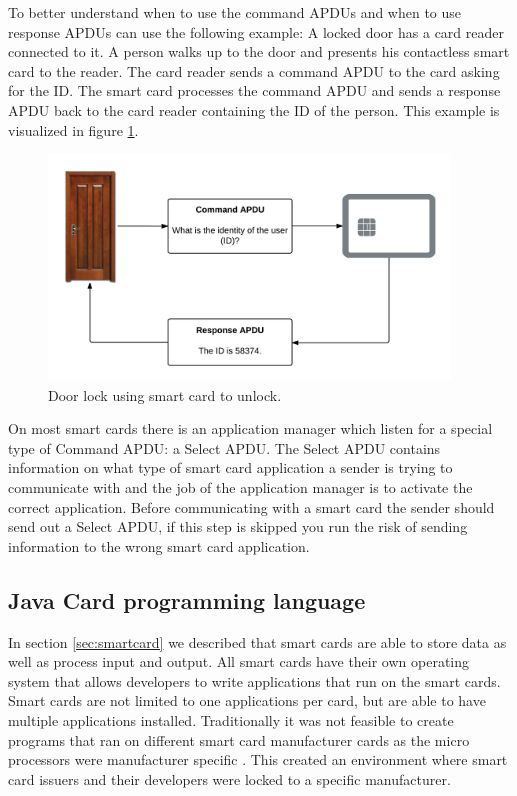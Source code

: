To better understand when to use the command APDUs and when to use response APDUs can use the following example: A locked door has a card reader connected to it. A person walks up to the door and presents his contactless smart card to the reader. The card reader sends a command APDU to the card asking for the ID. The smart card processes the command APDU and sends a response APDU back to the card reader containing the ID of the person. This example is visualized in figure \ref{fig:doornfc}.

\begin{figure}[h!]
  \caption{Door lock using smart card to unlock.}
  \label{fig:doornfc}
  \centering
    \includegraphics[width=0.95\textwidth]{images/doornfc.png}
\end{figure}

On most smart cards there is an application manager which listen for a special type of Command APDU: a Select APDU. The Select APDU contains information on what type of smart card application a sender is trying to communicate with and the job of the application manager is to activate the correct application. Before communicating with a smart card the sender should send out a Select APDU, if this step is skipped you run the risk of sending information to the wrong smart card application.

\subsection{Java Card programming language}
\label{sec:javacard}
In section \ref{sec:smartcard} we described that smart cards are able to store data as well as process input and output. All smart cards have their own operating system that allows developers to write applications that run on the smart cards. Smart cards are not limited to one applications per card, but are able to have multiple applications installed. Traditionally it was not feasible to create programs that ran on different smart card manufacturer cards as the micro processors were manufacturer specific \cite{javacardapplet}. This created an environment where smart card issuers and their developers were locked to a specific manufacturer.

